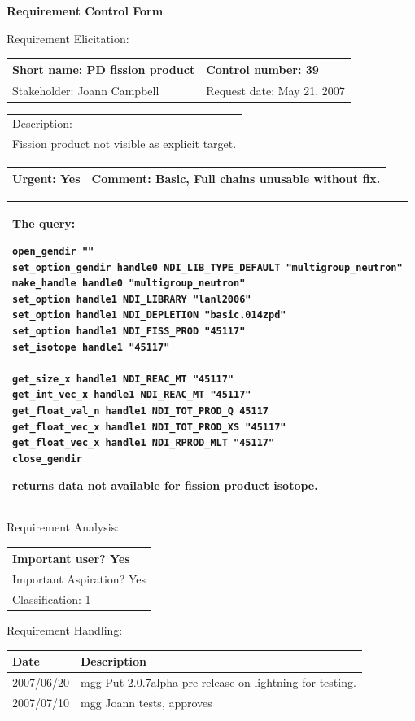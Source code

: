 \begin{center}\Large\bf
Requirement Control Form
\end{center}
\vspace{24pt}

Requirement Elicitation:

\begin{tabular}{|p{211pt}|p{211pt}|} \hline
Short name: PD fission product & Control number: 39\\ \hline
Stakeholder: Joann Campbell & Request date: May 21, 2007\\
\end{tabular}
\begin{tabular}{|p{433pt}|} \hline
Description: \\ 
Fission product not visible as explicit target.\\
\hline
\end{tabular} 
\begin{tabular}{|p{211pt}|p{211pt}|} \hline
Urgent: Yes & Comment: Basic, Full chains unusable without fix. \\ \hline
\end{tabular}

\vspace{12pt}

\begin{tabular}{|p{433pt}|} \hline
The query: 
\begin{verbatim}
open_gendir ""
set_option_gendir handle0 NDI_LIB_TYPE_DEFAULT "multigroup_neutron"
make_handle handle0 "multigroup_neutron"
set_option handle1 NDI_LIBRARY "lanl2006"
set_option handle1 NDI_DEPLETION "basic.014zpd"
set_option handle1 NDI_FISS_PROD "45117"
set_isotope handle1 "45117"

get_size_x handle1 NDI_REAC_MT "45117"
get_int_vec_x handle1 NDI_REAC_MT "45117"
get_float_val_n handle1 NDI_TOT_PROD_Q 45117
get_float_vec_x handle1 NDI_TOT_PROD_XS "45117"
get_float_vec_x handle1 NDI_RPROD_MLT "45117"
close_gendir
\end{verbatim}
returns data not available for fission product isotope.
\\ \hline
\end{tabular}
\vspace{24pt}

Requirement Analysis:

\begin{tabular}{|p{433pt}|} \hline
Important user? Yes \\ \hline
Important Aspiration? Yes \\ \hline
Classification: 1 \\ \hline
\end{tabular}
\vspace{24pt}

Requirement Handling:

\begin{tabular}{|p{72pt}|p{351pt}|} \hline
Date & Description \\ \hline
2007/06/20 & mgg Put 2.0.7alpha pre release on lightning for
testing. \\ \hline
2007/07/10 & mgg Joann tests, approves \\ \hline
\end{tabular}
